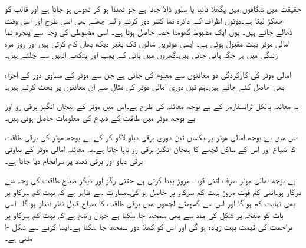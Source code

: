 حقیقت میں شگافوں میں پگھلا تانبا یا سلور  ڈالا جاتا ہے جو ٹھنڈا ہو کر ٹھوس ہو جاتا ہے اور قالب کو جھکڑ لیتا ہے۔دونوں اطراف کے دائرہ نما کسر دور کرنے والے چھلے بھی اسی طرح اور اسی وقت ڈھالے جاتے ہیں۔  یوں ایک مضبوط گھومتا حصہ حاصل ہوتا ہے۔ اسی مضبوطی کی وجہ سے  پنجرہ نما امالی موٹر بہت مقبول ہوئی ہے۔ ایسی موٹریں سالوں تک بغیر دیکھ بھال  کام کرتی ہیں اور روز مرہ  زندگی میں ہر جگہ پائی جاتی ہیں۔گھروں میں پانی کے پمپ اور پنکھے انہیں سے چلتے ہیں۔

امالی موٹر کی کارکردگی دو معائنوں سے معلوم کی جاتی ہے جن سے موٹر کے مساوی  دور کے اجزاء  بھی حاصل کئے جاتے ہیں۔ہم تین دوری امالی موٹر کی مثال سے ان معائنوں پر بحث کرتے ہیں۔

یہ معائنہ بالکل ٹرانسفارمر کے بے بوجھ معائنہ کی طرح ہے۔اس میں موٹر کے ہیجان انگیز برقی رو اور بے بوجھ موٹر میں طاقت کے ضیاع کی معلومات حاصل ہوتی ہیں۔ 

اس میں  بے بوجھ امالی موٹر پر یکساں تین دوری  برقی دباو  لاگو کر کے بے بوجھ موٹر کی برقی طاقت کا ضیاع  اور اس کے ساکن لچھے  کا ہیجان انگیز برقی رو  ناپا جاتا ہے۔یہ معائنہ امالی موٹر کے بناوٹی برقی دباو اور برقی تعدد پر سرانجام دیا جاتا ہے۔

بے بوجھ امالی موٹر صرف اتنی قوت مروڑ پیدا کرتی ہے جتنی رگڑ اور دیگر ضیاع طاقت کی وجہ سے درکار ہو۔اتنی کم قوت مروڑ بہت کم سرکاو پر حاصل ہو گی۔مساوات   سے ظاہر ہے کہ بہت کم سرکاو پر   بھی نہایت کم ہو گا  اور اس سے گھومتے لچھوں میں برقی طاقت کا ضیاع قابل نظر انداز ہو گا۔ اسی بات کو صفحہ  پر شکل   کی مدد سے بھی سمجھا جا سکتا ہے جہاں  واضح ہے کہ بہت کم سرکاو پر مزاحمت  کی قیمت بہت زیادہ ہو گی اور اس کو کھلا دور سمجھا جا سکتا ہے۔ایسا کرنے سے شکل -ا ملتی ہے۔

